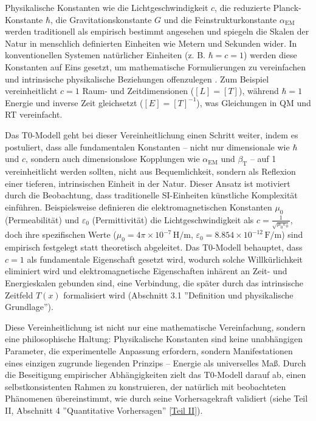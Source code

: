 \documentclass[12pt,a4paper]{article}
\newcommand{\Tfield}{T(x)}
\newcommand{\alphaEM}{\alpha_{\text{EM}}}
\newcommand{\betaT}{\beta_{\text{T}}}
\begin{document}
	Physikalische Konstanten wie die Lichtgeschwindigkeit \(c\), die reduzierte Planck-Konstante \(\hbar\), die Gravitationskonstante \(G\) und die Feinstrukturkonstante \(\alphaEM\) werden traditionell als empirisch bestimmt angesehen und spiegeln die Skalen der Natur in menschlich definierten Einheiten wie Metern und Sekunden wider. In konventionellen Systemen natürlicher Einheiten (z. B. \(\hbar = c = 1\)) werden diese Konstanten auf Eins gesetzt, um mathematische Formulierungen zu vereinfachen und intrinsische physikalische Beziehungen offenzulegen \cite{Planck1899,Duff2002}. Zum Beispiel vereinheitlicht \(c = 1\) Raum- und Zeitdimensionen (\([L] = [T]\)), während \(\hbar = 1\) Energie und inverse Zeit gleichsetzt (\([E] = [T]^{-1}\)), was Gleichungen in QM und RT vereinfacht.
	
	Das T0-Modell geht bei dieser Vereinheitlichung einen Schritt weiter, indem es postuliert, dass alle fundamentalen Konstanten – nicht nur dimensionale wie \(\hbar\) und \(c\), sondern auch dimensionslose Kopplungen wie \(\alphaEM\) und \(\betaT\) – auf 1 vereinheitlicht werden sollten, nicht aus Bequemlichkeit, sondern als Reflexion einer tieferen, intrinsischen Einheit in der Natur. Dieser Ansatz ist motiviert durch die Beobachtung, dass traditionelle SI-Einheiten künstliche Komplexität einführen. Beispielsweise definieren die elektromagnetischen Konstanten \(\mu_0\) (Permeabilität) und \(\varepsilon_0\) (Permittivität) die Lichtgeschwindigkeit als \(c = \frac{1}{\sqrt{\mu_0\varepsilon_0}}\), doch ihre spezifischen Werte (\(\mu_0 = 4\pi \times 10^{-7} \, \text{H/m}\), \(\varepsilon_0 = 8.854 \times 10^{-12} \, \text{F/m}\)) sind empirisch festgelegt statt theoretisch abgeleitet. Das T0-Modell behauptet, dass \(c = 1\) als fundamentale Eigenschaft gesetzt wird, wodurch solche Willkürlichkeit eliminiert wird und elektromagnetische Eigenschaften inhärent an Zeit- und Energieskalen gebunden sind, eine Verbindung, die später durch das intrinsische Zeitfeld \(\Tfield\) formalisiert wird (Abschnitt 3.1 ''Definition und physikalische Grundlage'').
	
	Diese Vereinheitlichung ist nicht nur eine mathematische Vereinfachung, sondern eine philosophische Haltung: Physikalische Konstanten sind keine unabhängigen Parameter, die experimentelle Anpassung erfordern, sondern Manifestationen eines einzigen zugrunde liegenden Prinzips – Energie als universelles Maß. Durch die Beseitigung empirischer Abhängigkeiten zielt das T0-Modell darauf ab, einen selbstkonsistenten Rahmen zu konstruieren, der natürlich mit beobachteten Phänomenen übereinstimmt, wie durch seine Vorhersagekraft validiert (siehe Teil II, Abschnitt 4 ''Quantitative Vorhersagen'' \href{https://github.com/jpascher/T0-Time-Mass-Duality/tree/main/2/pdf/Deutsch/QMRelTimeMassPart2.pdf}{[Teil II]}).
	
\end{document}
